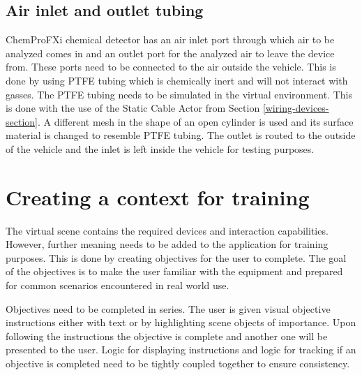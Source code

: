 \documentclass[12pt, a4paper,oneside, nocenter]{thesis}
\begin{document}
\subsection{Air inlet and outlet tubing}
ChemProFXi chemical detector has an air inlet port through which air to be analyzed comes in and an outlet port for the analyzed air to leave the device from. These ports need to be connected to the air outside the vehicle. This is done by using PTFE tubing which is chemically inert and will not interact with gasses. The PTFE tubing needs to be simulated in the virtual environment. This is done with the use of the Static Cable Actor from Section \ref{wiring-devices-section}. A different mesh in the shape of an open cylinder is used and its surface material is changed to resemble PTFE tubing. The outlet is routed to the outside of the vehicle and the inlet is left inside the vehicle for testing purposes.
\section{Creating a context for training}
The virtual scene contains the required devices and interaction capabilities. However, further meaning needs to be added to the application for training purposes. This is done by creating objectives for the user to complete. The goal of the objectives is to make the user familiar with the equipment and prepared for common scenarios encountered in real world use.
\par
Objectives need to be completed in series. The user is given visual objective instructions either with text or by highlighting scene objects of importance. Upon following the instructions the objective is complete and another one will be presented to the user. Logic for displaying instructions and logic for tracking if an objective is completed need to be tightly coupled together to ensure consistency.
\end{document}
